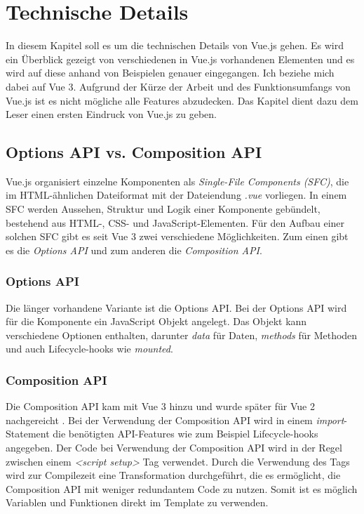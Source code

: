 

\chapter{Technische Details}\label{ch:technische-details}
In diesem Kapitel soll es um die technischen Details von Vue.js gehen.
Es wird ein Überblick gezeigt von verschiedenen in Vue.js vorhandenen Elementen
und es wird auf diese anhand von Beispielen genauer eingegangen.
Ich beziehe mich dabei auf Vue 3.
Aufgrund der Kürze der Arbeit und des Funktionsumfangs von Vue.js ist es nicht mögliche alle Features abzudecken.
Das Kapitel dient dazu dem Leser einen ersten Eindruck von Vue.js zu geben.


\section{Options API vs. Composition API}\label{sec:options-api-and-composition-api}
Vue.js organisiert einzelne Komponenten als \emph{Single-File Components (SFC)},
die im HTML-ähnlichen Dateiformat mit der Dateiendung \emph{.vue} vorliegen.
In einem SFC werden Aussehen, Struktur und Logik einer Komponente gebündelt, bestehend aus HTML-, CSS- und JavaScript-Elementen.
Für den Aufbau einer solchen SFC gibt es seit Vue 3 zwei verschiedene Möglichkeiten.
Zum einen gibt es die \emph{Options API} und zum anderen die \emph{Composition API}. \cite{vueIntroduction}

\subsection*{Options API}
Die länger vorhandene Variante ist die Options API.
Bei der Options API wird für die Komponente ein JavaScript Objekt angelegt.
Das Objekt kann verschiedene Optionen enthalten, darunter \emph{data} für Daten, \emph{methods} für Methoden und auch Lifecycle-hooks wie \emph{mounted}.
\cite{vueIntroduction}

\subsection*{Composition API}
Die Composition API kam mit Vue 3 hinzu und wurde später für Vue 2 nachgereicht \cite{vueFAQ}.
Bei der Verwendung der Composition API wird in einem \emph{import}-Statement
die benötigten API-Features wie zum Beispiel Lifecycle-hooks angegeben.
Der Code bei Verwendung der Composition API wird in der Regel zwischen einem \emph{<script setup>} Tag verwendet.
Durch die Verwendung des Tags wird zur Compilezeit eine Transformation durchgeführt,
die es ermöglicht, die Composition API mit weniger redundantem Code zu nutzen.
Somit ist es möglich Variablen und Funktionen direkt im Template zu verwenden.
\cite{vueIntroduction}

